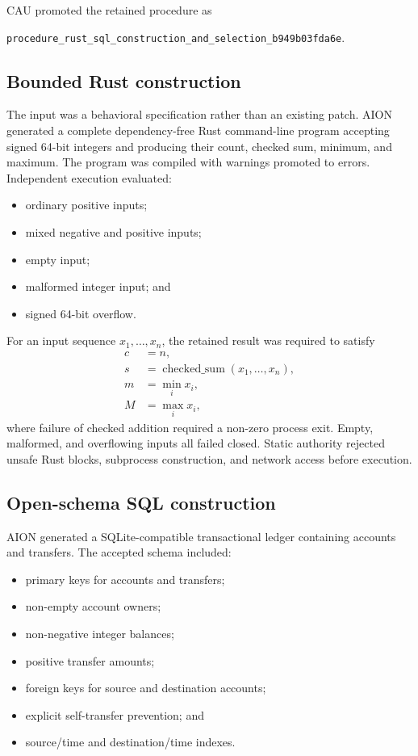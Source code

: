 CAU promoted the retained procedure as
\begin{center}
\texttt{procedure\_rust\_sql\_construction\_and\_selection\_b949b03fda6e}.
\end{center}

\subsection{Bounded Rust construction}

The input was a behavioral specification rather than an existing patch.  AION
generated a complete dependency-free Rust command-line program accepting signed
64-bit integers and producing their count, checked sum, minimum, and maximum.
The program was compiled with warnings promoted to errors.  Independent
execution evaluated:
\begin{itemize}
  \item ordinary positive inputs;
  \item mixed negative and positive inputs;
  \item empty input;
  \item malformed integer input; and
  \item signed 64-bit overflow.
\end{itemize}

For an input sequence $x_1,\ldots,x_n$, the retained result was required to
satisfy
\begin{equation}
\begin{split}
c &= n, \\
s &= \operatorname{checked\_sum}(x_1,\ldots,x_n), \\
m &= \min_i x_i, \\
M &= \max_i x_i,
\end{split}
\label{eq:rust-stats-contract}
\end{equation}
where failure of checked addition required a non-zero process exit.  Empty,
malformed, and overflowing inputs all failed closed.  Static authority rejected
unsafe Rust blocks, subprocess construction, and network access before
execution.

\subsection{Open-schema SQL construction}

AION generated a SQLite-compatible transactional ledger containing accounts and
transfers.  The accepted schema included:
\begin{itemize}
  \item primary keys for accounts and transfers;
  \item non-empty account owners;
  \item non-negative integer balances;
  \item positive transfer amounts;
  \item foreign keys for source and destination accounts;
  \item explicit self-transfer prevention; and
  \item source/time and destination/time indexes.
\end{itemize}

